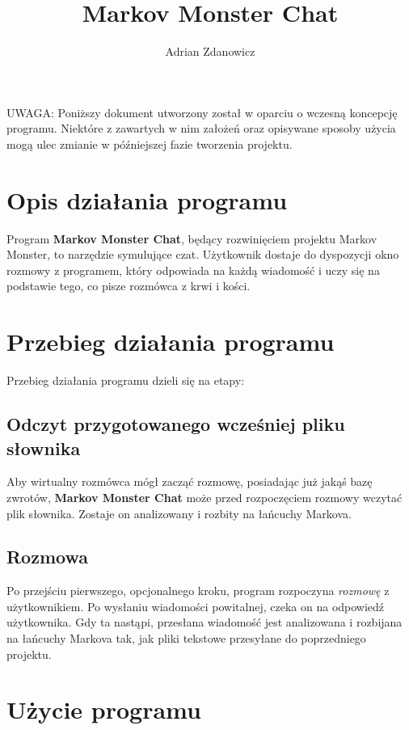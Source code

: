 \documentclass{article}
\title{Markov Monster Chat}
\author{Adrian Zdanowicz}
\begin{document}
\maketitle


UWAGA: Poniższy dokument utworzony został w oparciu o wczesną koncepcję programu.
Niektóre z zawartych w nim założeń oraz opisywane sposoby użycia mogą
ulec zmianie w późniejszej fazie tworzenia projektu.


\section{Opis działania programu}

Program \textbf{Markov Monster Chat}, będący rozwinięciem projektu Markov Monster, to
narzędzie symulujące czat. Użytkownik dostaje do dyspozycji okno rozmowy z programem, który
odpowiada na każdą wiadomość i uczy się na podstawie tego, co pisze rozmówca z krwi i kości.


\section{Przebieg działania programu}

Przebieg działania programu dzieli się na etapy:

\subsection{Odczyt przygotowanego wcześniej pliku słownika}

Aby wirtualny rozmówca mógł zacząć rozmowę, posiadając już jakąś bazę zwrotów, \textbf{Markov Monster Chat} może przed rozpoczęciem rozmowy wczytać plik słownika. Zostaje on analizowany
i rozbity na łańcuchy Markova.

\subsection{Rozmowa}

Po przejściu pierwszego, opcjonalnego kroku, program rozpoczyna \textit{rozmowę} z użytkownikiem. Po wysłaniu wiadomości powitalnej, czeka on na odpowiedź użytkownika. Gdy
ta nastąpi, przesłana wiadomość jest analizowana i rozbijana na łańcuchy Markova tak, jak pliki
tekstowe przesyłane do poprzedniego projektu.


\section{Użycie programu}
\end{document}

